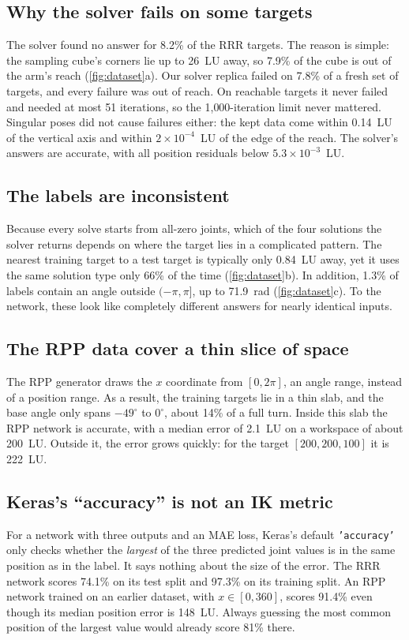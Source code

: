 \documentclass[conference]{IEEEtran}
\newcommand{\code}[1]{\texttt{#1}}
\begin{document}
\subsection{Why the solver fails on some targets}
The solver found no answer for 8.2\% of the RRR targets. The reason is simple: the sampling cube's corners lie up to 26~LU away, so 7.9\% of the cube is out of the arm's reach (\cref{fig:dataset}a). Our solver replica failed on 7.8\% of a fresh set of targets, and every failure was out of reach. On reachable targets it never failed and needed at most 51 iterations, so the 1{,}000-iteration limit never mattered. Singular poses did not cause failures either: the kept data come within 0.14~LU of the vertical axis and within $2\times10^{-4}$~LU of the edge of the reach. The solver's answers are accurate, with all position residuals below $5.3\times10^{-3}$~LU.

\subsection{The labels are inconsistent}
Because every solve starts from all-zero joints, which of the four solutions the solver returns depends on where the target lies in a complicated pattern. The nearest training target to a test target is typically only 0.84~LU away, yet it uses the same solution type only 66\% of the time (\cref{fig:dataset}b). In addition, 1.3\% of labels contain an angle outside $(-\pi,\pi]$, up to 71.9~rad (\cref{fig:dataset}c). To the network, these look like completely different answers for nearly identical inputs.

\subsection{The RPP data cover a thin slice of space}
The RPP generator draws the $x$ coordinate from $[0,2\pi]$, an angle range, instead of a position range. As a result, the training targets lie in a thin slab, and the base angle only spans $-49^\circ$ to $0^\circ$, about 14\% of a full turn. Inside this slab the RPP network is accurate, with a median error of 2.1~LU on a workspace of about 200~LU. Outside it, the error grows quickly: for the target $[200,200,100]$ it is 222~LU.

\subsection{Keras's ``accuracy'' is not an IK metric}
For a network with three outputs and an MAE loss, Keras's default \code{'accuracy'} only checks whether the \emph{largest} of the three predicted joint values is in the same position as in the label. It says nothing about the size of the error. The RRR network scores 74.1\% on its test split and 97.3\% on its training split. An RPP network trained on an earlier dataset, with $x\in[0,360]$, scores 91.4\% even though its median position error is 148~LU. Always guessing the most common position of the largest value would already score 81\% there.
\end{document}
